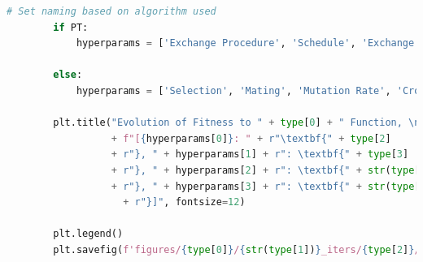 \documentclass[10pt]{article}
\begin{document}
\begin{lstlisting}[language=Python, caption=plotting\_functions.py, label=plotting_functionspy]
        # Set naming based on algorithm used
        if PT:
            hyperparams = ['Exchange Procedure', 'Schedule', 'Exchange Param', 'Power Term']
    
        else:
            hyperparams = ['Selection', 'Mating', 'Mutation Rate', 'Crossover Prob']
    
        plt.title("Evolution of Fitness to " + type[0] + " Function, \n" 
                  + f"[{hyperparams[0]}: " + r"\textbf{" + type[2] 
                  + r"}, " + hyperparams[1] + r": \textbf{" + type[3] 
                  + r"}, " + hyperparams[2] + r": \textbf{" + str(type[4])
                  + r"}, " + hyperparams[3] + r": \textbf{" + str(type[5])
                    + r"}]", fontsize=12)
        
        plt.legend()
        plt.savefig(f'figures/{type[0]}/{str(type[1])}_iters/{type[2]}/{type[3]}/{type[4]}_{type[5]}_Fitness.png')    
\end{lstlisting}
\end{document}
